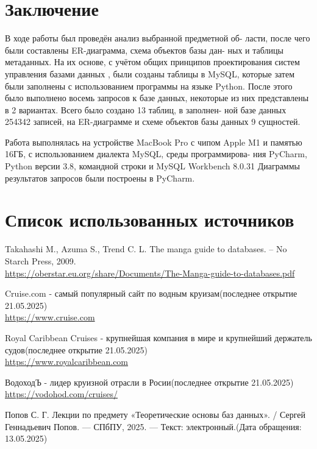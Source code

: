 \documentclass[11pt,a4paper,final]{article}
\begin{document}
\newpage
\section* {Заключение}
\par В ходе работы был проведён анализ выбранной предметной об-
ласти, после чего были составлены ER-диаграмма, схема объектов базы дан-
ных и таблицы метаданных. На их основе, с учётом общих принципов проектирования систем управления базами данных \cite{sys}, были созданы таблицы в MySQL,
которые затем были заполнены с использованием программы на языке Python.
После этого было выполнено восемь запросов к базе данных, некоторые из
них представлены в 2 вариантах. Всего было создано 13 таблиц, в заполнен-
ной базе данных 254342 записей, на ER-диаграмме и схеме объектов базы
данных 9 сущностей.
\par Работа выполнялась на устройстве MacBook Pro с чипом Apple M1
и памятью 16ГБ, с использованием диалекта MySQL, среды программирова-
ния PyCharm, Python версии 3.8, командной строки и MySQL Workbench 8.0.31
Диаграммы результатов запросов были построены в PyCharm.


\newpage
\section* {Список использованных источников}
\begin{thebibliography}{9}
		
	  Takahashi M., Azuma S., Trend C. L. The manga guide to databases. – No Starch Press, 2009. \\
	 \href {https://oberstar.eu.org/share/Documents/The-Manga-guide-to-databases.pdf}{https://oberstar.eu.org/share/Documents/The-Manga-guide-to-databases.pdf}

	      Cruise.com - самый популярный сайт по водным круизам(последнее открытие 21.05.2025)\\	   
          \href{https://www.cruise.com}{https://www.cruise.com}	

	   Royal Caribbean Cruises - крупнейшая компания в мире и крупнейший держатель судов(последнее открытие 21.05.2025)\\	   
       \href{https://www.royalcaribbean.com}{https://www.royalcaribbean.com}	

	   ВодоходЪ - лидер круизной отрасли в Росии(последнее открытие 21.05.2025)\\	   
       \href{https://vodohod.com/cruises/}{https://vodohod.com/cruises/}

        Попов С. Г. Лекции по предмету «Теоретические основы баз данных». / Сергей Геннадьевич Попов. — СПбПУ, 2025. — Текст: электронный.(Дата обращения: 13.05.2025)
			
\end{thebibliography}
\end{document}
